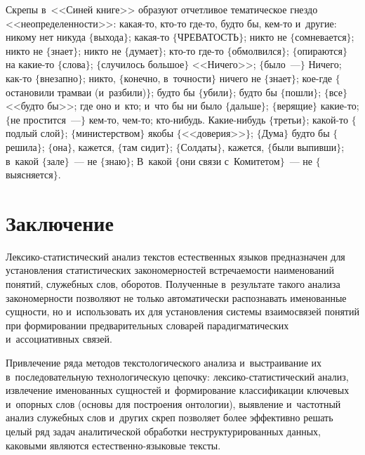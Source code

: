 \begin{multicols}{2}
     Скрепы в~<<Синей книге>> образуют отчетливое тематическое гнездо 
<<неопределенности>>: какая-то, кто-то где-то, будто бы, кем-то и~другие:
никому нет никуда $\{$выхода$\}$; какая-то $\{$ЧРЕВАТОСТЬ$\}$; никто 
не $\{$сомневается$\}$; никто не $\{$знает$\}$; никто не $\{$думает$\}$; 
кто-то где-то $\{$обмолвился$\}$; $\{$опираются$\}$ на ка\-кие-то 
$\{$слова$\}$; $\{$случилось большое$\}$ <<Ничего>>; $\{$было~---$\}$ 
Ничего; как-то $\{$внезапно$\}$; никто, $\{$конечно, в~точ\-ности$\}$ 
ничего не $\{$знает$\}$; кое-где $\{$остановили трамваи (и~разбили)$\}$; 
будто бы $\{$убили$\}$; будто бы $\{$пошли$\}$; $\{$все$\}$ <<будто бы>>; 
где оно и~кто; и~что бы ни было $\{$дальше$\}$; $\{$верящие$\}$ ка\-кие-то; 
$\{$не прос\-тит\-ся~---$\}$ кем-то, чем-то; кто-ни\-будь. Ка\-кие-ни\-будь 
$\{$третьи$\}$; ка\-кой-то $\{$подлый слой$\}$; $\{$министерством$\}$ 
якобы $\{$<<доверия>>$\}$; $\{$Дума$\}$ будто бы $\{$решила$\}$; 
$\{$она$\}$, кажется, $\{$там сидит$\}$; $\{$Солдаты$\}$, кажется, $\{$были 
выпивши$\}$; в~какой $\{$зале$\}$~--- не $\{$знаю$\}$; В~какой $\{$они 
связи с~Комитетом$\}$~--- не $\{$выясняется$\}$.
    
   \section{Заключение}
     
     Лексико-статистический анализ текстов естественных языков 
предназначен для установления статистических закономерностей 
встре\-ча\-емости наименований понятий, служебных слов, оборотов. 
Полученные в~результате такого анализа закономерности позволяют не 
только автоматически распознавать именованные сущности, но 
и~использовать их для установления системы взаимосвязей понятий при 
формировании предварительных словарей парадигматических 
и~ассоциативных связей.
{ %

}
     
     Привлечение ряда методов текстологического анализа и~выстраивание 
их в~последовательную технологическую цепочку:  
лек\-си\-ко-ста\-ти\-сти\-че\-ский анализ, извлечение именованных сущностей 
и~формирование классификации ключевых и~опорных слов (основы для 
построения онтологии), выявление и~частотный анализ служебных слов 
и~других скреп позволяет более эффективно решать целый ряд задач 
аналитической обработки неструктурированных данных, каковыми являются 
ес\-тест\-вен\-но-язы\-ко\-вые тексты.

\vspace*{-12pt} 
    

\end{multicols}
